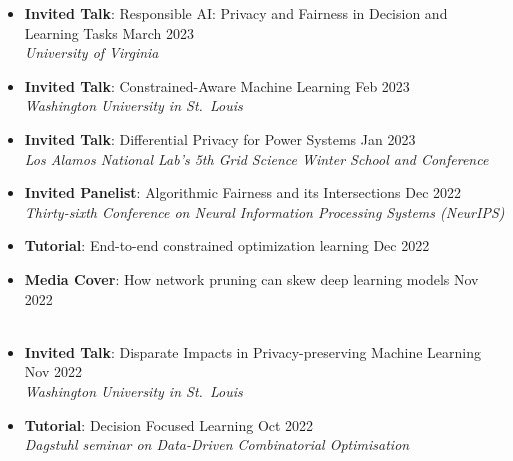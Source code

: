 \begin{itemize}
  \item {\bf Invited Talk}: {Responsible AI: Privacy and Fairness in Decision and Learning Tasks} \hfill{March 2023}\\
  {\em  University of Virginia}

  \item {\bf Invited Talk}: {Constrained-Aware Machine Learning} \hfill{Feb 2023}\\
  {\em  Washington University in St.~Louis}

  \item {\bf Invited Talk}: {Differential Privacy for Power Systems} \hfill{Jan 2023}\\
  {\em  Los Alamos National Lab's 5th Grid Science Winter School and Conference}

  \item {\bf Invited Panelist}: {Algorithmic Fairness and its Intersections} \hfill{Dec 2022}\\
  {\em Thirty-sixth Conference on Neural Information Processing Systems (NeurIPS)}

  \item {\bf Tutorial}: {End-to-end constrained optimization learning} \hfill{Dec 2022}\\

  \item {\bf Media Cover}: 
  {How network pruning can skew deep learning models} \hfill {Nov 2022}\\ 
  ~
  ~
  ~

  \item {\bf Invited Talk}: {Disparate Impacts in Privacy-preserving Machine Learning} \hfill{Nov 2022}\\
  {\em Washington University in St.~Louis} 

  \item {\bf Tutorial}: {Decision Focused Learning} \hfill{Oct 2022}\\
  \em{Dagstuhl seminar on Data-Driven Combinatorial Optimisation}
  

\end{itemize}
